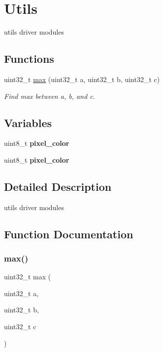 \hypertarget{group___utils}{}\section{Utils}
\label{group___utils}


utils driver modules  


\subsection*{Functions}
\begin{DoxyCompactItemize}
\item 
uint32\+\_\+t \hyperlink{group___utils_gafa33c555a40e71b0cc32aa3731f6fabe}{max} (uint32\+\_\+t a, uint32\+\_\+t b, uint32\+\_\+t c)
\begin{DoxyCompactList}\small\item\em Find max between a, b, and c. \end{DoxyCompactList}\end{DoxyCompactItemize}
\subsection*{Variables}
\begin{DoxyCompactItemize}
\item 
\mbox{\label{group___utils_ga91a0f4b54880f52e0b02f7aeb96ca304}} 
uint8\+\_\+t {\bfseries pixel\+\_\+color}
\item 
\mbox{\label{group___utils_ga91a0f4b54880f52e0b02f7aeb96ca304}} 
uint8\+\_\+t {\bfseries pixel\+\_\+color}
\end{DoxyCompactItemize}


\subsection{Detailed Description}
utils driver modules 



\subsection{Function Documentation}
\mbox{\label{group___utils_gafa33c555a40e71b0cc32aa3731f6fabe}} 
\subsubsection{\texorpdfstring{max()}{max()}}
{\footnotesize\ttfamily uint32\+\_\+t max (\begin{DoxyParamCaption}\item[{uint32\+\_\+t}]{a,  }\item[{uint32\+\_\+t}]{b,  }\item[{uint32\+\_\+t}]{c }\end{DoxyParamCaption})}



